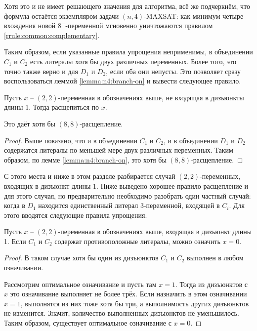 Хотя это и не имеет решающего значения для алгоритма, всё же подчеркнём, что формула остаётся экземпляром задачи $(n,4)$-MAXSAT: как минимум четыре вхождения новой $8^-$-переменной мгновенно уничтожаются правилом \ref{rrule:common:complementary}.

Таким образом, если указанные правила упрощения неприменимы, в объединении $C_1$ и $C_2$ есть литералы хотя бы двух различных переменных.
Более того, это точно также верно и для $D_1$ и $D_2$, если оба они непусты.
Это позволяет сразу воспользоваться леммой \ref{lemma:n4:branch-on} и вывести следующее правило.

\begin{brule}
 Пусть $x$ -- $(2,2)$-переменная в обозначениях выше, не входящая в дизъюнкты длины 1. Тогда расщепиться по $x$.

 Это даёт хотя бы $(8,8)$-расщепление.
 \label{brule:n4:22:nouc}
\end{brule}

\begin{proof}
 Выше показано, что и в объединении $C_1$ и $C_2$, и в объединении $D_1$ и $D_2$ содержатся литералы по меньшей мере двух различных переменных. Таким образом, по лемме \ref{lemma:n4:branch-on}, это хотя бы $(8,8)$-расщепление.
\end{proof}

С этого места и ниже в этом разделе разбирается случай $(2,2)$-переменных, входящих в дизъюнкт длины 1.
Ниже выведено хорошее правило расщепление и для этого случая, но предварительно необходимо разобрать один частный случай: когда в $D_1$ находится единственный литерал 3-переменной, входящей в $C_i$. Для этого вводятся следующие правила упрощения.

\begin{rrule}
 Пусть $x$ -- $(2,2)$-переменная в обозначениях выше, входящая в дизъюнкт длины 1. Если $C_1$ и $C_2$ содержат противоположные литералы, можно означить $x = 0$.
 \label{rrule:n4:22:uc-compl}
\end{rrule}

\begin{proof}
 В таком случае хотя бы один из дизъюнктов $C_1$ и $C_2$ выполнен в любом означивании.

 Рассмотрим оптимальное означивание и пусть там $x = 1$. Тогда из дизъюнктов с $x$ это означивание выполняет не более трёх. Если назначить в этом означивании $x = 1$, выполнятся из них тоже хотя бы три, а выполнимость других дизъюнктов не изменится. Значит, количество выполненных дизъюнктов не уменьшилось. Таким образом, существует оптимальное означивание с $x = 0$.
\end{proof}

